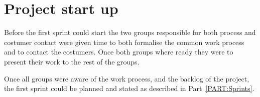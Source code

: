 \section{Project start up}
Before the first sprint could start the two groups responsible for both process and costumer contact were given time to both formalise the common work process and to contact the costumers.
Once both groups where ready they were to present their work to the rest of the groups.

Once all groups were aware of the work process, and the backlog of the project, the first sprint could be planned and stated as described in Part~\ref{PART:Sprints}.
